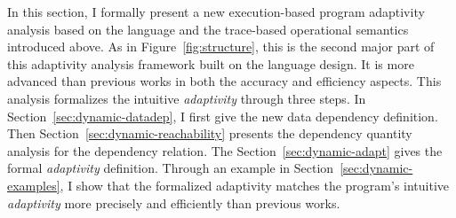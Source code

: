 In this section, 
I formally present a new execution-based program adaptivity analysis based on the language and the trace-based operational semantics introduced above.
As in Figure~\ref{fig:structure}, this is the second major part of this adaptivity analysis framework
built on the language design. 
It is more advanced than previous works
in both the accuracy and efficiency aspects.
This analysis formalizes the intuitive \emph{adaptivity} through three steps.
In Section~\ref{sec:dynamic-datadep}, I first give the new data dependency definition.
Then Section~\ref{sec:dynamic-reachability} presents the dependency quantity analysis for the dependency relation.
The  Section~\ref{sec:dynamic-adapt} gives the formal \emph{adaptivity} definition.
Through an example in Section~\ref{sec:dynamic-examples}, I show that the formalized
adaptivity matches the program's intuitive \emph{adaptivity} more precisely and efficiently than previous works.

